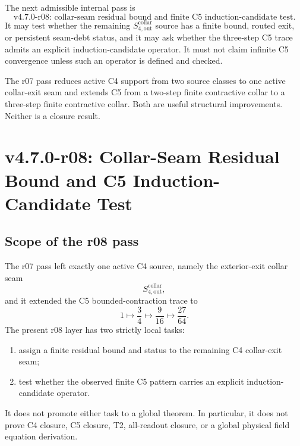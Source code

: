 \begin{corollary}
\label{cor:v470-r07-permitted-r08-direction}
The next admissible internal pass is
\[
\text{v4.7.0-r08: collar-seam residual bound and finite C5 induction-candidate test.}
\]
It may test whether the remaining \(S_{4,\mathrm{out}}^{\mathrm{collar}}\)
source has a finite bound, routed exit, or persistent seam-debt status, and it
may ask whether the three-step C5 trace admits an explicit induction-candidate
operator.  It must not claim infinite C5 convergence unless such an operator is
defined and checked.
\end{corollary}

\begin{remark}[r07 summary]
The r07 pass reduces active C4 support from two source classes to one active
collar-exit seam and extends C5 from a two-step finite contractive collar to a
three-step finite contractive collar.  Both are useful structural improvements.
Neither is a closure result.
\end{remark}




\section{v4.7.0-r08: Collar-Seam Residual Bound and C5 Induction-Candidate Test}
\label{sec:v470-r08-collar-seam-c5-induction-candidate}

\subsection{Scope of the r08 pass}
\label{subsec:v470-r08-scope}

The r07 pass left exactly one active C4 source, namely the exterior-exit collar
seam
\[
S_{4,\mathrm{out}}^{\mathrm{collar}},
\]
and it extended the C5 bounded-contraction trace to
\[
1\longmapsto \frac34\longmapsto \frac{9}{16}\longmapsto \frac{27}{64}.
\]
The present r08 layer has two strictly local tasks:
\begin{enumerate}
    \item assign a finite residual bound and status to the remaining C4
    collar-exit seam;
    \item test whether the observed finite C5 pattern carries an explicit
    induction-candidate operator.
\end{enumerate}
It does not promote either task to a global theorem.  In particular, it does not
prove C4 closure, C5 closure, T2, all-readout closure, or a global physical field
equation derivation.

